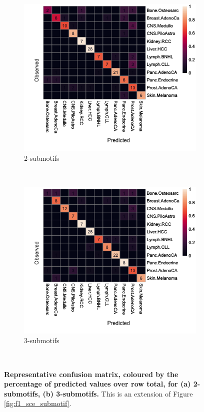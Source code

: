 \begin{figure}[ht!]
    \begin{subfigure}{.5\textwidth}
    \centering
    \includegraphics[width=\textwidth,height=0.9\textwidth]{graphics/confusion_matrix_2-submotifs.png}
    \caption{2-submotifs}
    \label{fig:confusion_2-submotifs}
    \end{subfigure}
    ~
    \begin{subfigure}{.5\textwidth}
    \centering
    \includegraphics[width=\textwidth,height=0.9\textwidth]{graphics/confusion_matrix_3-submotif.png}
    \caption{3-submotifs}
    \label{fig:confusion_3-submotifs}
    \end{subfigure} \\
    
    \caption{\textbf{Representative confusion matrix, coloured by the percentage of predicted values over row total, for (a) 2-submotifs, (b) 3-submotifs.} This is an extension of Figure \ref{fig:f1_sce_submotif}.}
    \label{fig:apdx_ml_submotifs}
\end{figure}